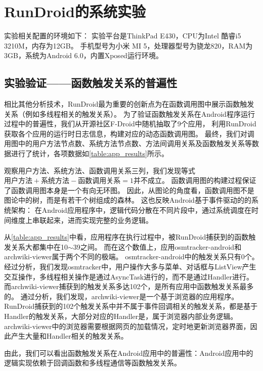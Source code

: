
\chapter{RunDroid的系统实验}  
\label{chp:testing}


实验相关配置的环境如下：
实验平台是ThinkPad E430，CPU为Intel 酷睿i5 3210M，内存为12GB。
手机型号为小米 MI 5，处理器型号为骁龙820，RAM为3GB，系统为Android 6.0，内置Xposed运行环境。




\section{实验验证——函数触发关系的普遍性}

相比其他分析技术，RunDroid最为重要的创新点为在函数调用图中展示函数触发关系（例如多线程相关的触发关系）。
为了验证函数触发关系在Android程序运行过程中的普遍性，我们从开源社区F-Droid\cite{FDroidFr21:online}中随机抽取了9个应用，
利用RunDroid获取各个应用的运行时日志信息，构建对应的动态函数调用图。
最终，我们对调用图中的用户方法节点数、系统方法节点数、方法间调用关系及函数触发关系等数据进行了统计，各项数据如\autoref{table:app_results}所示。

观察用户方法、系统方法、函数调用关系三列，我们发现等式$\text{用户方法}+\text{系统方法}-\text{函数调用关系}=1$并不成立。
函数调用图的构建过程保证了函数调用图本身是一个有向无环图。
因此，从图论的角度看，函数调用图不是图论中的树，而是有若干个树组成的森林。
这也反映Android基于事件驱动的的系统架构：
在Android应用程序中，逻辑代码分散在不同片段中，通过系统调度在时间维度上串联起来，进而实现完整的业务逻辑。


从\autoref{table:app_results}中看，应用程序在执行过程中，被RunDroid捕获到的函数触发关系大都集中在10$\sim$39之间。
而在这个数值上，应用osmtracker-android和	archwiki-viewer属于两个不同的极端。
osmtracker-android中的触发关系只有0个。
经过分析，我们发现osmtracker中，用户操作大多与菜单、对话框与ListView产生交互操作，多线程相关操作是通过AsyncTask进行的，而不是通过Handler进行。
而archwiki-viewer捕获到的触发关系多达102个，是所有应用中函数触发关系最多的。
通过分析，我们发现，archwiki-viewer是一个基于浏览器的应用程序。
RunDroid捕获到的102个触发关系中并不属于事件回调相关的触发关系，都是基于Handler的触发关系，大部分对应的Handler是，属于浏览器内部业务逻辑。
archwiki-viewer中的浏览器需要根据网页的加载情况，定时地更新浏览器界面，因此产生大量和Handler相关的触发关系。

由此，我们可以看出函数触发关系在Android应用中的普遍性：Android应用中的逻辑实现依赖于回调函数和多线程通信等函数触发关系。

